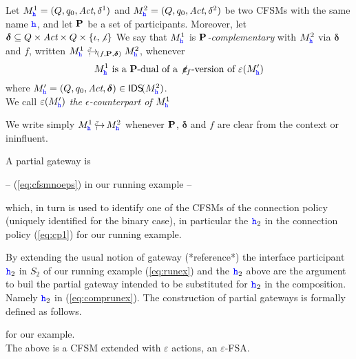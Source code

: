  \begin{definition}
\label{def:Pcomplementarity}
Let $M^1_\hh = (Q, q_0, \textit{Act}, \delta^1)$ and 
$M^2_\hh = (Q, q_0, \textit{Act}, \delta^2)$  
be two CFSMs with the same name $\hh$, and let $\roles$ be a set of participants.
Moreover, let $\bm{\delta} \subseteq Q\times\textit{Act}\times Q \times \Set{\intf,\nintf}$
We say that
$M^1_\hh$ is {\em $\roles$-complementary} with $M^2_\hh$ via $\bm{\delta}$ and $f$, written $\emb{f}{\roles}{\bm{\delta}}{M^1_\hh}{M^2_\hh}$, whenever 
$$M^1_\hh \text{ is a $\roles$-dual of a $\noeps_{\!f}$-version of } \varepsilon(M'_\hh)$$
where $M'_\hh= (Q, q_0, \textit{Act}, \bm{\delta})\in\IDS(M^2_\hh)$.\\
We call $\varepsilon(M'_\hh)$ {\em the $\epsilon$-counterpart of $M^1_\hh$}
\end{definition}

\noindent
We write simply $M^1_\hh \embd M^2_\hh$ whenever
$\roles$, $\bm\delta$ and $f$ are clear from the context or ininfluent.

A partial gateway is 

-- (\ref{eq:cfsmnoeps}) in our running example --

which, in turn is used to identify one of the CFSMs of the connection policy (uniquely identified
for the binary case), in particular the $\hh_2$ in the connection policy (\ref{eq:cp1})
for our running example.

By extending the usual notion of gateway (*reference*) the interface participant $\hh_2$ in
$S_2$ of our running example (\ref{eq:runex}) and the $\hh_2$ above  
are the argument to buil the partial gateway intended to be substituted for $\hh_2$ in the composition.
Namely $\hh_2$ in (\ref{eq:comprunex}).
The construction of partial gateways is formally defined as follows.

  


for  our example.\\
The above is  a CFSM extended with $\varepsilon$ actions, an $\varepsilon$-FSA.   

